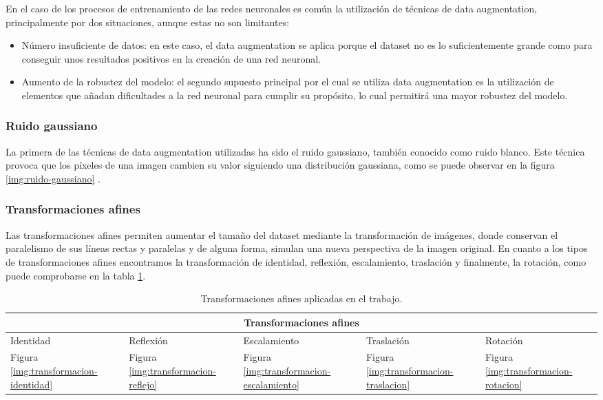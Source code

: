 En el caso de los procesos de entrenamiento de las redes neuronales es común
la utilización de técnicas de data augmentation, principalmente por dos situaciones, aunque estas no son limitantes:

\begin{itemize}
	\item Número insuficiente de datos: en este caso, el data augmentation se aplica porque el dataset no es lo suficientemente grande como para conseguir unos resultados 
positivos en la creación de una red neuronal.
	\item Aumento de la robustez del modelo: el segundo supuesto principal por el cual se utiliza data augmentation es la utilización de elementos que añadan dificultades a la
red neuronal para cumplir su propósito, lo cual permitirá una mayor robustez del modelo.
\end{itemize}

\subsubsection{Ruido gaussiano}

La primera de las técnicas de data augmentation utilizadas ha sido el ruido gaussiano, también conocido como ruido blanco. 
Este técnica provoca que los píxeles de una imagen cambien su valor siguiendo una distribución gaussiana, como se puede observar en la figura \ref{img:ruido-gaussiano} .


\subsubsection{Transformaciones afines}

Las transformaciones afines permiten aumentar el tamaño del dataset mediante la transformación de imágenes, donde conservan el paralelismo de sus líneas rectas y paralelas y de alguna forma, simulan una nueva perspectiva de la imagen original.
En cuanto a los tipos de transformaciones afines encontramos la transformación de identidad, reflexión, escalamiento, traslación y finalmente, la rotación, como puede comprobarse en la tabla \ref{tabla:transformaciones-afines}.

\begin{table}[h!]
\begin{tabular}{ |p{2cm}|p{1.8cm}|p{2.2cm} |p{2cm}|p{1.8cm}|}
	\hline
	\multicolumn{5}{|c|}{Transformaciones afines}\\ 
	\hline
	Identidad & Reflexión &Escalamiento & Traslación  & Rotación\\
	\hline
	Figura \ref{img:transformacion-identidad} & Figura \ref{img:transformacion-reflejo}     & Figura \ref{img:transformacion-escalamiento} &   Figura \ref{img:transformacion-traslacion} &   Figura \ref{img:transformacion-rotacion}\\
	\hline
\end{tabular}
\caption{\label{tabla:transformaciones-afines}Transformaciones afines aplicadas en el trabajo.}
\end{table}


